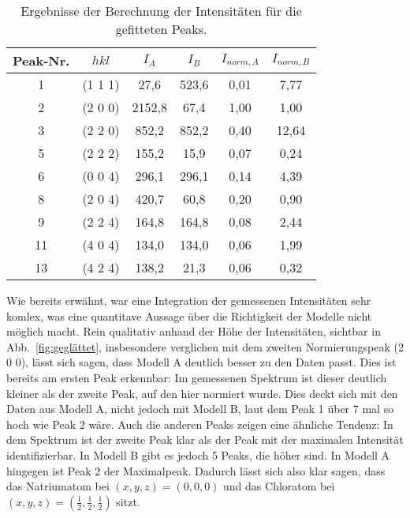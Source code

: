 \begin{table}[h!]
    \centering
    \begin{tabular}{|c|c|c|c|c|c|}
        \hline
        Peak-Nr. & $hkl$&$I_A$ & $I_B$ & $I_{norm,A}$ & $I_{norm,B}$ \\ [0.5ex]
        \hline\hline
        1 & (1 1 1) &27,6 & 523,6 & 0,01 & 7,77 \\
        2 & (2 0 0)&2152,8 & 67,4 & 1,00 & 1,00 \\
        3 & (2 2 0)&852,2 & 852,2 & 0,40 & 12,64 \\
        5 & (2 2 2)&155,2 & 15,9 & 0,07 & 0,24 \\
        6 & (0 0 4)&296,1 & 296,1 & 0,14 & 4,39 \\
        8 & (2 0 4)&420,7 & 60,8 & 0,20 & 0,90 \\
        9 & (2 2 4)&164,8 & 164,8 & 0,08 & 2,44 \\
        11 & (4 0 4)&134,0 & 134,0 & 0,06 & 1,99 \\
        13 & (4 2 4)&138,2 & 21,3 & 0,06 & 0,32 \\ [1ex]
       \hline
       \end{tabular}
        \caption[short]{Ergebnisse der Berechnung der Intensitäten für die gefitteten Peaks.}
        \label{tab:ergebnisse2}
\end{table}

Wie bereits erwähnt, war eine Integration der gemessenen Intensitäten sehr komlex, was eine quantitave Aussage über die Richtigkeit der Modelle nicht möglich macht. Rein qualitativ anhand der Höhe der Intensitäten, sichtbar in Abb.~\ref{fig:geglättet}, insbesondere verglichen mit dem zweiten Normierungspeak (2 0 0), lässt sich sagen, dass Modell A deutlich besser zu den Daten passt. Dies ist bereits am ersten Peak erkennbar: Im gemessenen Spektrum ist dieser deutlich kleiner als der zweite Peak, auf den hier normiert wurde. Dies deckt sich mit den Daten aus Modell A, nicht jedoch mit Modell B, laut dem Peak 1 über 7 mal so hoch wie Peak 2 wäre. Auch die anderen Peaks zeigen eine ähnliche Tendenz: In dem Spektrum ist der zweite Peak klar als der Peak mit der maximalen Intensität identifizierbar. In Modell B gibt es jedoch 5 Peaks, die höher sind. In Modell A hingegen ist Peak 2 der Maximalpeak. Dadurch lässt sich also klar sagen, dass das Natriumatom bei $(x,y,z) = (0,0,0)$ und das Chloratom bei $(x,y,z) = (\frac{1}{2}, \frac{1}{2}, \frac{1}{2})$ sitzt.